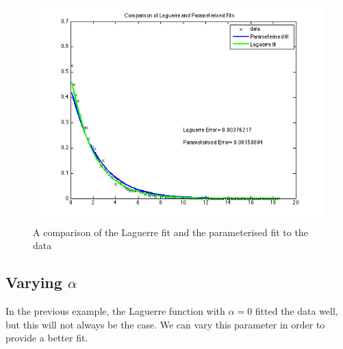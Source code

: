 \documentclass{article}
\begin{document}
\begin{figure}[h]
\centering
	\begin{minipage}[c][][b]{0.45\linewidth}
		\begin{center}
		\includegraphics[scale=0.35]{Matlab/FittingData/Graph/compareLandP.png}  
		\end{center}
		\caption[b]{A comparison of the Laguerre fit and the parameterised fit to the data}
		\label{compareLandP}
	\end{minipage}
\quad\quad\quad\quad

\end{figure}













\subsection{Varying $\alpha$}

In the previous example, the Laguerre function with $\alpha = 0$ fitted the data well, but this will not always be the case. We can vary this parameter in order to provide a better fit. 
\end{document}
